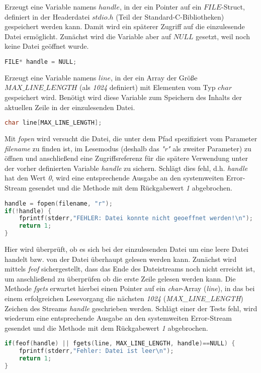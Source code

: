 \documentclass[11pt]{scrartcl}
\begin{document}
Erzeugt eine Variable namens \emph{$handle$}, in der ein Pointer auf ein \emph{$FILE$}-Struct, definiert in der Headerdatei \emph{$stdio.h$} (Teil der Standard-C-Bibliotheken) gespeichert werden kann. Damit wird ein späterer Zugriff auf die einzulesende Datei ermöglicht. Zunächst wird die Variable aber auf \emph{$NULL$} gesetzt, weil noch keine Datei geöffnet wurde.
\begin{lstlisting}[language=C]
FILE* handle = NULL;
\end{lstlisting}
Erzeugt eine Variable namens \emph{$line$}, in der ein Array der Größe \emph{$MAX\_LINE\_LENGTH$} (als \emph{1024} definiert) mit Elementen vom Typ \emph{$char$} gespeichert wird. Benötigt wird diese Variable zum Speichern des Inhalts der aktuellen Zeile in der einzulesenden Datei.
\begin{lstlisting}[language=C]
char line[MAX_LINE_LENGTH];
\end{lstlisting}
Mit \emph{fopen} wird versucht die Datei, die unter dem Pfad spezifiziert vom Parameter \emph{filename} zu finden ist, im Lesemodus (deshalb das \emph{"r"} als zweiter Parameter) zu öffnen und anschließend eine Zugriffsreferenz für die spätere Verwendung unter der vorher definierten Variable \emph{handle} zu sichern. Schlägt dies fehl, d.h. \emph{handle} hat den Wert \emph{0}, wird eine entsprechende Ausgabe an den systemweiten Error-Stream gesendet und die Methode mit dem Rückgabewert \emph{1} abgebrochen.
\begin{lstlisting}[language=C]
handle = fopen(filename, "r");
if(!handle) {
	fprintf(stderr,"FEHLER: Datei konnte nicht geoeffnet werden!\n");
	return 1; 
}
\end{lstlisting}
Hier wird überprüft, ob es sich bei der einzulesenden Datei um eine leere Datei handelt bzw. von der Datei überhaupt gelesen werden kann. Zunächst wird mittels \emph{feof} sichergestellt, dass das Ende des Dateistreams noch nicht erreicht ist, um anschließend zu überprüfen ob die erste Zeile gelesen werden kann. Die Methode \emph{fgets} erwartet hierbei einen Pointer auf ein \emph{char}-Array (\emph{line}), in das bei einem erfolgreichen Lesevorgang die nächsten \emph{1024} (\emph{MAX\_LINE\_LENGTH}) Zeichen des Streams \emph{handle} geschrieben werden. Schlägt einer der Tests fehl, wird wiederum eine entsprechende Ausgabe an den systemweiten Error-Stream gesendet und die Methode mit dem Rückgabewert \emph{1} abgebrochen.
\begin{lstlisting}[language=C]
if(feof(handle) || fgets(line, MAX_LINE_LENGTH, handle)==NULL) {
	fprintf(stderr,"Fehler: Datei ist leer\n");
	return 1;
}
\end{lstlisting}
\end{document}
